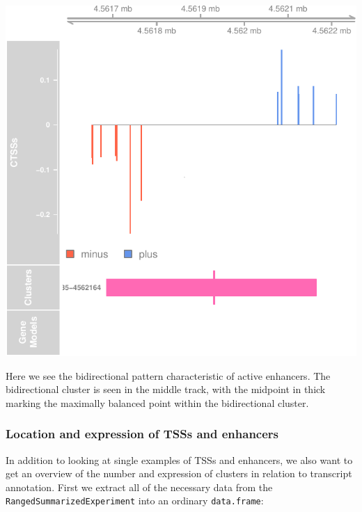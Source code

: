 \documentclass[9pt,a4paper,]{extarticle}
\newenvironment{Shaded}{\begin{snugshade}}{\end{snugshade}}
\newcommand{\KeywordTok}[1]{\textcolor[rgb]{0.13,0.29,0.53}{\textbf{{#1}}}}
\newcommand{\StringTok}[1]{\textcolor[rgb]{0.31,0.60,0.02}{{#1}}}
\newcommand{\NormalTok}[1]{{#1}}
\begin{document}
\begin{center}\includegraphics{CAGEWorkflow_files/figure-latex/simpleEnhancer-1} \end{center}

Here we see the bidirectional pattern characteristic of active enhancers. The bidirectional cluster is seen in the middle track, with the midpoint in thick marking the maximally balanced point within the bidirectional cluster.

\subsubsection{Location and expression of TSSs and enhancers}\label{location-and-expression-of-tsss-and-enhancers}

In addition to looking at single examples of TSSs and enhancers, we also want to get an overview of the number and expression of clusters in relation to transcript annotation. First we extract all of the necessary data from the \texttt{RangedSummarizedExperiment} into an ordinary \texttt{data.frame}:

\begin{Shaded}
\end{Shaded}
\end{document}
